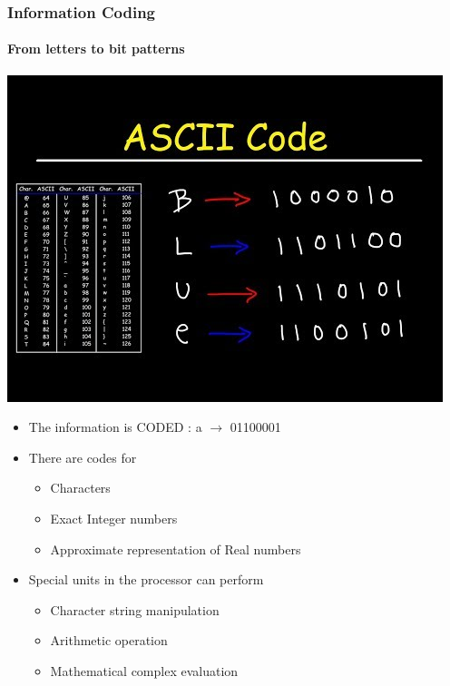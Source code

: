 \documentclass[unknownkeysallowed, 10pt, a4 paper, handout]{beamer}
\begin{document}
\begin{frame}[label=Coding]
  \frametitle{Information Coding}
  \framesubtitle{From letters to bit patterns}
  \begin{center}
    \includegraphics[scale=0.25]{pics/ascii.jpg}
  \end{center}
  \begin{itemize}
   \item The information is CODED : a $\rightarrow$ 01100001
   \item There are codes for
     \begin{itemize}
       \item Characters
       \item Exact Integer numbers
       \item Approximate representation of Real numbers
     \end{itemize}
   \item Special units in the processor can perform
     \begin{itemize}
       \item Character string manipulation
       \item Arithmetic operation
       \item Mathematical complex evaluation
     \end{itemize}
  \end{itemize}
\end{frame}
\end{document}
